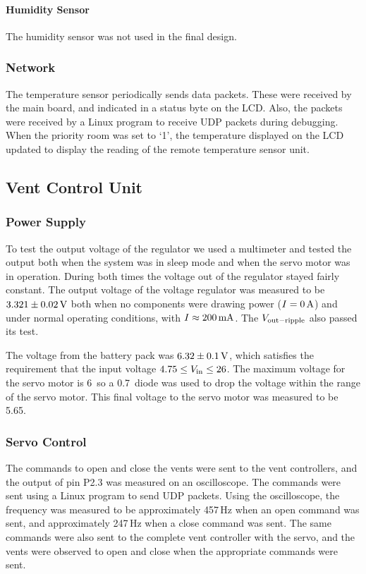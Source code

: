 \paragraph{Humidity Sensor}
The humidity sensor was not used in the final design.

\subsubsection{Network}
The temperature sensor periodically sends data packets.  These were received by the main board, and indicated in a status byte on the LCD.  Also, the packets were received by a Linux program to receive UDP packets during debugging.  When the priority room was set to `1', the temperature displayed on the LCD updated to display the reading of the remote temperature sensor unit.

\subsection{Vent Control Unit}
\subsubsection{Power Supply}
To test the output voltage of the regulator we used a multimeter and tested the output both when the system was in sleep mode and when the servo motor was in operation. During both times the voltage out of the regulator stayed fairly constant. The output voltage of the voltage regulator was measured to be $3.321 \pm 0.02\mbox{\,V}$ both when no components were drawing power ($I=0\mbox{\,A}$) and under normal operating conditions, with $I\approx200\mbox{\,mA}$. The $V_{\rm out-ripple}$ also passed its test.

The voltage from the battery pack was $6.32 \pm 0.1 \mbox{\,V}$, which satisfies the requirement that the input voltage $4.75 \leq V_{\rm in} \leq 26$. The maximum voltage for the servo motor is 6\volts\, so a 0.7\volts\ diode was used to drop the voltage within the range of the servo motor. This final voltage to the servo motor was measured to be 5.65\volts .

\subsubsection{Servo Control}
The commands to open and close the vents were sent to the vent controllers, and the output of pin P2.3 was measured on an oscilloscope. The commands were sent using a Linux program to send UDP packets.  Using the oscilloscope, the frequency was measured to be approximately 457\,Hz when an open command was sent, and approximately 247\,Hz when a close command was sent. The same commands were also sent to the complete vent controller with the servo, and the vents were observed to open and close when the appropriate commands were sent.

